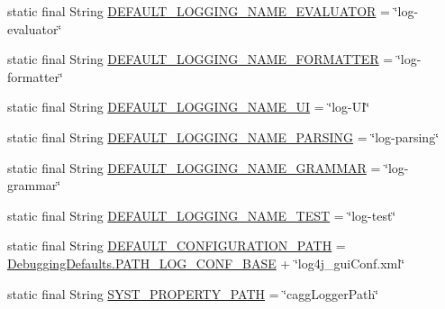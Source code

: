\begin{DoxyCompactItemize}
\item 
static final String \hyperlink{classit_1_1emarolab_1_1cagg_1_1debugging_1_1CaggLoggersManager_af8668f66339e9fdbd8cbca1d1852b907}{D\-E\-F\-A\-U\-L\-T\-\_\-\-L\-O\-G\-G\-I\-N\-G\-\_\-\-N\-A\-M\-E\-\_\-\-E\-V\-A\-L\-U\-A\-T\-O\-R} = \char`\"{}log-\/evaluator\char`\"{}
\item 
static final String \hyperlink{classit_1_1emarolab_1_1cagg_1_1debugging_1_1CaggLoggersManager_a8d1bf14ebce8a765bf0e3bb3c297f268}{D\-E\-F\-A\-U\-L\-T\-\_\-\-L\-O\-G\-G\-I\-N\-G\-\_\-\-N\-A\-M\-E\-\_\-\-F\-O\-R\-M\-A\-T\-T\-E\-R} = \char`\"{}log-\/formatter\char`\"{}
\item 
static final String \hyperlink{classit_1_1emarolab_1_1cagg_1_1debugging_1_1CaggLoggersManager_a3b51785eebcc2bb8567fec2a24c852f7}{D\-E\-F\-A\-U\-L\-T\-\_\-\-L\-O\-G\-G\-I\-N\-G\-\_\-\-N\-A\-M\-E\-\_\-\-U\-I} = \char`\"{}log-\/U\-I\char`\"{}
\item 
static final String \hyperlink{classit_1_1emarolab_1_1cagg_1_1debugging_1_1CaggLoggersManager_a74281e8f0cdfe13db3ef845431d1a736}{D\-E\-F\-A\-U\-L\-T\-\_\-\-L\-O\-G\-G\-I\-N\-G\-\_\-\-N\-A\-M\-E\-\_\-\-P\-A\-R\-S\-I\-N\-G} = \char`\"{}log-\/parsing\char`\"{}
\item 
static final String \hyperlink{classit_1_1emarolab_1_1cagg_1_1debugging_1_1CaggLoggersManager_a6c6eb274fcef16768a35606f2349b56e}{D\-E\-F\-A\-U\-L\-T\-\_\-\-L\-O\-G\-G\-I\-N\-G\-\_\-\-N\-A\-M\-E\-\_\-\-G\-R\-A\-M\-M\-A\-R} = \char`\"{}log-\/grammar\char`\"{}
\item 
static final String \hyperlink{classit_1_1emarolab_1_1cagg_1_1debugging_1_1CaggLoggersManager_ac1c78028992a81449f47affcde374730}{D\-E\-F\-A\-U\-L\-T\-\_\-\-L\-O\-G\-G\-I\-N\-G\-\_\-\-N\-A\-M\-E\-\_\-\-T\-E\-S\-T} = \char`\"{}log-\/test\char`\"{}
\item 
static final String \hyperlink{classit_1_1emarolab_1_1cagg_1_1debugging_1_1CaggLoggersManager_a8747e94c7e76529ca883149dde22742e}{D\-E\-F\-A\-U\-L\-T\-\_\-\-C\-O\-N\-F\-I\-G\-U\-R\-A\-T\-I\-O\-N\-\_\-\-P\-A\-T\-H} = \hyperlink{classit_1_1emarolab_1_1cagg_1_1debugging_1_1DebuggingDefaults_a234dc33c418c2f57b65a6df9b8dee986}{Debugging\-Defaults.\-P\-A\-T\-H\-\_\-\-L\-O\-G\-\_\-\-C\-O\-N\-F\-\_\-\-B\-A\-S\-E} + \char`\"{}log4j\-\_\-gui\-Conf.\-xml\char`\"{}
\item 
static final String \hyperlink{classit_1_1emarolab_1_1cagg_1_1debugging_1_1CaggLoggersManager_a4e1dd2229e2b86598fca025eb256d807}{S\-Y\-S\-T\-\_\-\-P\-R\-O\-P\-E\-R\-T\-Y\-\_\-\-P\-A\-T\-H} = \char`\"{}cagg\-Logger\-Path\char`\"{}
\end{DoxyCompactItemize}
